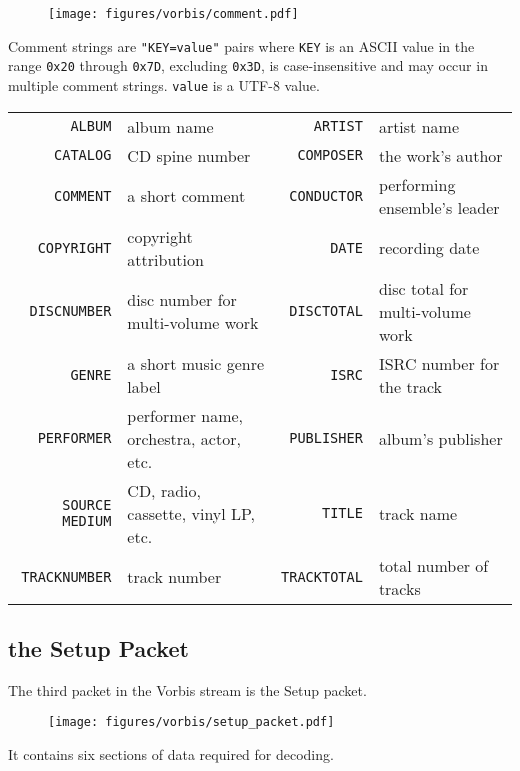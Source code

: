 \begin{figure}[h]
\texttt{[image: figures/vorbis/comment.pdf]}
\end{figure}
\par
\noindent
Comment strings are \texttt{"KEY=value"} pairs
where \texttt{KEY} is an ASCII value in the range \texttt{0x20}
through \texttt{0x7D}, excluding \texttt{0x3D},
is case-insensitive and may occur in multiple comment strings.
\texttt{value} is a UTF-8 value.
\begin{table}[h]
{
  \begin{tabular}{rlrl}
    \texttt{ALBUM} & album name &
    \texttt{ARTIST} & artist name \\
    \texttt{CATALOG} & CD spine number &
    \texttt{COMPOSER} & the work's author \\
    \texttt{COMMENT} & a short comment &
    \texttt{CONDUCTOR} & performing ensemble's leader \\
    \texttt{COPYRIGHT} & copyright attribution &
    \texttt{DATE} & recording date \\
    \texttt{DISCNUMBER} & disc number for multi-volume work &
    \texttt{DISCTOTAL} & disc total for multi-volume work \\
    \texttt{GENRE} & a short music genre label &
    \texttt{ISRC} & ISRC number for the track \\
    \texttt{PERFORMER} & performer name, orchestra, actor, etc. &
    \texttt{PUBLISHER} & album's publisher \\
    \texttt{SOURCE MEDIUM} & CD, radio, cassette, vinyl LP, etc. &
    \texttt{TITLE} & track name \\
    \texttt{TRACKNUMBER} & track number &
    \texttt{TRACKTOTAL} & total number of tracks \\
  \end{tabular}
}
\end{table}

\clearpage

\subsection{the Setup Packet}

The third packet in the Vorbis stream is the Setup packet.

\begin{figure}[h]
\texttt{[image: figures/vorbis/setup\_packet.pdf]}
\end{figure}

It contains six sections of data required for decoding.

